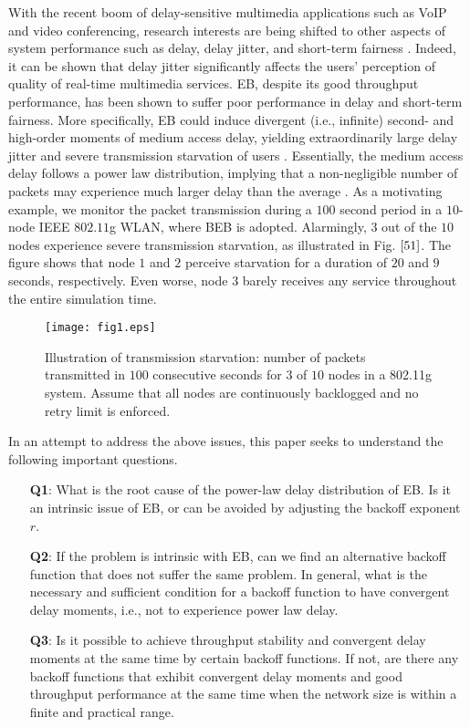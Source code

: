 \documentclass[journal]{IEEEtran}
\begin{document}
With the recent boom of delay-sensitive multimedia applications such as VoIP and video conferencing, research interests are being shifted to other aspects of system performance such as delay, delay jitter, and short-term fairness \cite{2009:Cho}. Indeed, it can be shown that delay jitter significantly affects the users' perception of quality of real-time multimedia services. EB, despite its good throughput performance, has been shown to suffer poor performance in delay and short-term fairness. More specifically, EB could induce divergent (i.e., infinite) second- and high-order moments of medium access delay, yielding extraordinarily large delay jitter and severe transmission starvation of users \cite{2007:Sakurai,2009:Liew,2009:Cho,2010:Zhang}. Essentially, the medium access delay follows a power law distribution, implying that a non-negligible number of packets may experience much larger delay than the average \cite{2009:Liew,2007:Sakurai,2009:Cho}. As a motivating example, we monitor the packet transmission during a $100$ second period in a $10$-node IEEE $802.11$g WLAN, where BEB is adopted. Alarmingly, $3$ out of the $10$ nodes experience severe transmission starvation, as illustrated in Fig. $\ref{51}$. The figure shows that node $1$ and $2$ perceive starvation for a duration of $20$ and $9$ seconds, respectively. Even worse, node $3$ barely receives any service throughout the entire simulation time.

\begin{figure}
\centering
  \begin{center}
    \texttt{[image: fig1.eps]}
  \end{center}
  \caption{Illustration of transmission starvation: number of packets transmitted in $100$ consecutive seconds for $3$ of $10$ nodes in a 802.11g system. Assume that all nodes are continuously backlogged and no retry limit is enforced.}
  \label{51}
\end{figure}

In an attempt to address the above issues, this paper seeks to understand the following important questions.
\begin{enumerate}
  \item[\textbf{Q1}:] What is the root cause of the power-law delay distribution of EB. Is it an intrinsic issue of EB, or can be avoided by adjusting the backoff exponent $r$.
  \item[\textbf{Q2}:] If the problem is intrinsic with EB, can we find an alternative backoff function that does not suffer the same problem. In general, what is the necessary and sufficient condition for a backoff function to have convergent delay moments, i.e., not to experience power law delay.
  \item[\textbf{Q3}:] Is it possible to achieve throughput stability and convergent delay moments at the same time by certain backoff functions. If not, are there any backoff functions that exhibit convergent delay moments and good throughput performance at the same time when the network size is within a finite and practical range.
\end{enumerate}
\end{document}
